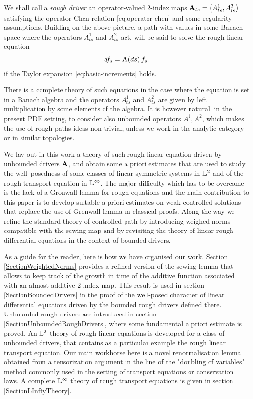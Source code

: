 \documentclass[11pt,a4paper]{amsart}
\newcommand{\ssk}{\smallskip}
\numberwithin{equation}{section} %
\begin{document}
\medskip

We shall call a \emph{rough driver} an operator-valued $2$-index maps ${\bf A}_{ts}=\big(A^1_{ts},A^2_{ts}\big)$ satisfying the operator Chen relation \eqref{eq:operator-chen} and some regularity assumptions. Building on the above picture, a path with values in some Banach space where the operators $A^1_{ts}$ and $A^2_{ts}$ act, will be said to solve the rough linear equation
$$
df_s = {\bf A}(ds)\,f_s.
$$
if the Taylor expansion \eqref{eq:basic-increments} holds.

\ssk

There is a complete theory of such equations in the case where the equation is set in a Banach algebra and the operators $A^1_{ts}$ and $A^2_{ts}$ are given by left multiplication by some elements of the algebra. It is however natural, in the present PDE setting, to consider also unbounded operators $A^1, A^2$, which makes the use of rough paths ideas non-trivial, unless we work in the analytic category or in similar topologies. 

\medskip
 
We lay out in this work a theory of such rough linear equation driven by unbounded drivers $\bf A$, and obtain some a priori estimates that are used to study the well--posedness of some classes of linear symmetric systems in $\mathbb{L}^2$ and of the rough transport equation in $\mathbb{L}^\infty$. The major difficulty which has to be overcome is the lack of a Gronwall lemma for rough equations and the main contribution to this paper is to develop suitable a priori estimates on weak controlled solutions that replace the use of Gronwall lemma in classical proofs. Along the way we refine the standard theory of controlled path by introducing weighed norms compatible with the sewing map and by revisiting the theory of linear rough differential equations in the context of bounded drivers. 

\medskip

As a guide for the reader, here is how we have organised our work. Section \ref{SectionWeightedNorms} provides a refined version of the sewing lemma that allows to keep track of the growth in time of the additive function associated with an almost-additive $2$-index map. This result is used in section \ref{SectionBoundedDrivers} in the proof of the well-posed character of linear differential equations driven by the bounded rough drivers defined there. Unbounded rough drivers are introduced in section \ref{SectionUnboundedRoughDrivers}, where some fundamental a priori estimate is proved. An $\mathbb{L}^2$ theory of rough linear equations is developed for a class of unbounded drivers, that contains as a particular example the rough linear transport equation. Our main workhorse here is a novel renormalisation lemma obtained from a tensorization argument in the line of the "doubling of variables" method commonly used in the setting of transport equations or conservation laws. A complete $\mathbb{L}^\infty$ theory of rough transport equations is given in section \ref{SectionLInftyTheory}.
\end{document}
